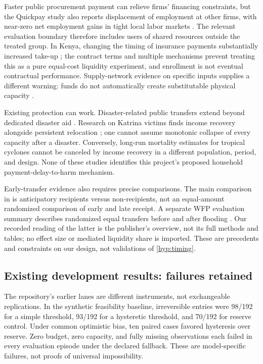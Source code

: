 \documentclass[11pt,a4paper]{article}
\numberwithin{equation}{section}
\theoremstyle{definition}
\theoremstyle{plain}
\theoremstyle{remark}
\begin{document}
Faster public procurement payment can relieve firms' financing constraints, but the Quickpay study also reports displacement of employment at other firms, with near-zero net employment gains in tight local labor markets \citep{barrotnanda2020}. The relevant evaluation boundary therefore includes users of shared resources outside the treated group. In Kenya, changing the timing of insurance payments substantially increased take-up \citep{casaburiwillis2018}; the contract terms and multiple mechanisms prevent treating this as a pure equal-cost liquidity experiment, and enrollment is not eventual contractual performance. Supply-network evidence on specific inputs supplies a different warning: funds do not automatically create substitutable physical capacity \citep{barrotsauvagnat2016}.

Existing protection can work. Disaster-related public transfers extend beyond dedicated disaster aid \citep{deryugina2017}. Research on Katrina victims finds income recovery alongside persistent relocation \citep{deryugina2018}; one cannot assume monotonic collapse of every capacity after a disaster. Conversely, long-run mortality estimates for tropical cyclones \citep{younghsiang2024} cannot be canceled by income recovery in a different population, period, and design. None of these studies identifies this project's proposed household payment-delay-to-harm mechanism.

Early-transfer evidence also requires precise comparisons. The main comparison in \citet{pople2026} is anticipatory recipients versus non-recipients, not an equal-amount randomized comparison of early and late receipt. A separate WFP evaluation summary describes randomized equal transfers before and after flooding \citep{wfp2026}. Our recorded reading of the latter is the publisher's overview, not its full methods and tables; no effect size or mediated liquidity share is imported. These are precedents and constraints on our design, not validations of \cref{hyp:timing}.

\subsection{Existing development results: failures retained}
\label{sec:development}

The repository's earlier lanes are different instruments, not exchangeable replications. In the synthetic feasibility baseline, irreversible entries were 98/192 for a simple threshold, 93/192 for a hysteretic threshold, and 70/192 for reserve control. Under common optimistic bias, ten paired cases favored hysteresis over reserve. Zero budget, zero capacity, and fully missing observations each failed in every evaluation episode under the declared fallback. These are model-specific failures, not proofs of universal impossibility.
\end{document}
